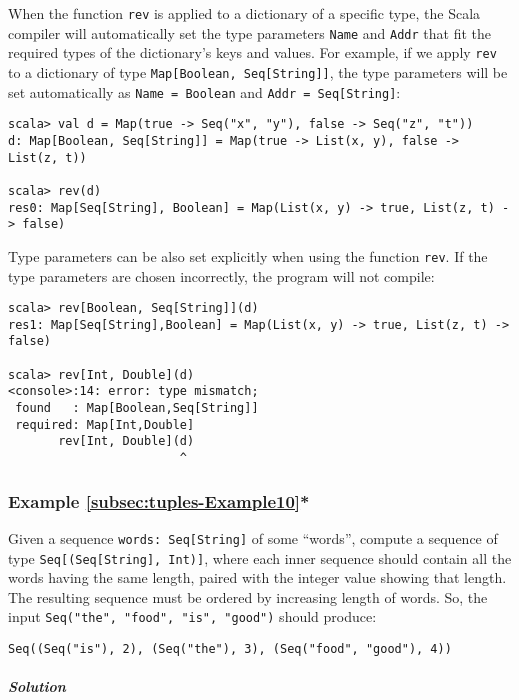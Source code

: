 When the function \lstinline!rev! is applied to a dictionary of a
specific type, the Scala compiler will automatically set the type
parameters \lstinline!Name! and \lstinline!Addr! that fit the required
types of the dictionary\textsf{'}s keys and values. For example, if we apply
\lstinline!rev! to a dictionary of type \lstinline!Map[Boolean, Seq[String]]!,
the type parameters will be set automatically as \lstinline!Name = Boolean!
and \lstinline!Addr = Seq[String]!:
\begin{lstlisting}
scala> val d = Map(true -> Seq("x", "y"), false -> Seq("z", "t"))
d: Map[Boolean, Seq[String]] = Map(true -> List(x, y), false -> List(z, t))

scala> rev(d)
res0: Map[Seq[String], Boolean] = Map(List(x, y) -> true, List(z, t) -> false)
\end{lstlisting}
Type parameters can be also set explicitly when using the function
\lstinline!rev!. If the type parameters are chosen incorrectly, the
program will not compile:
\begin{lstlisting}
scala> rev[Boolean, Seq[String]](d)
res1: Map[Seq[String],Boolean] = Map(List(x, y) -> true, List(z, t) -> false)

scala> rev[Int, Double](d)
<console>:14: error: type mismatch;
 found   : Map[Boolean,Seq[String]]
 required: Map[Int,Double]
       rev[Int, Double](d)
                        ^
\end{lstlisting}


\subsubsection{Example \label{subsec:tuples-Example10}\ref{subsec:tuples-Example10}{*}}

Given a sequence \lstinline!words: Seq[String]! of some \textsf{``}words\textsf{''},
compute a sequence of type \lstinline!Seq[(Seq[String], Int)]!, where
each inner sequence should contain all the words having the same length,
paired with the integer value showing that length. The resulting sequence
must be ordered by increasing length of words. So, the input \lstinline!Seq("the", "food", "is", "good")!
should produce:
\begin{lstlisting}
Seq((Seq("is"), 2), (Seq("the"), 3), (Seq("food", "good"), 4))
\end{lstlisting}


\subparagraph{Solution}

